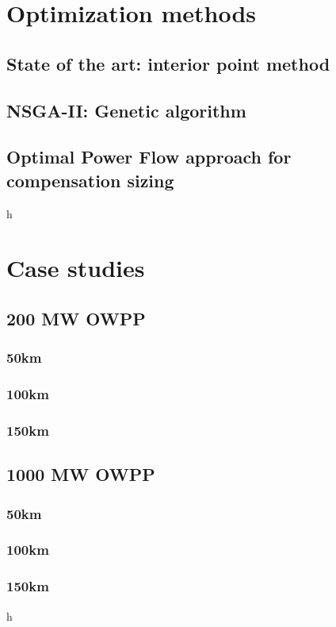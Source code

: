 \documentclass[a4paper,11pt, titlepage, twoside]{article}
\begin{document}
\section{Optimization methods}\label{Optimization}

\subsection{State of the art: interior point method}
\subsection{NSGA-II: Genetic algorithm}
\subsection{Optimal Power Flow approach for compensation sizing}
h
\section{Case studies}\label{CaseStudies}

\subsection{200 MW OWPP}
\subsubsection{50km}
\subsubsection{100km}
\subsubsection{150km}
\subsection{1000 MW OWPP}
\subsubsection{50km}
\subsubsection{100km}
\subsubsection{150km}
h
\end{document}

